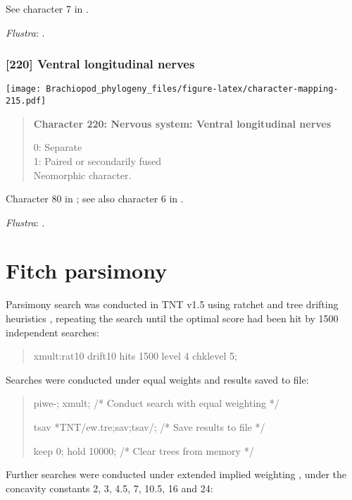 \documentclass[openany]{book}
\theoremstyle{definition}
\theoremstyle{definition}
\theoremstyle{definition}
\theoremstyle{remark}
\begin{document}
See character 7 in \citet{Haszprunar2008}.

\hypertarget{Flustra-coding-219}{}
\emph{Flustra}: \citet{Temereva2016Thenervous}.

\subsection*{{[}220{]} Ventral longitudinal
nerves}\label{ventral-longitudinal-nerves}

\texttt{[image: Brachiopod\_phylogeny\_files/figure-latex/character-mapping-215.pdf]}

\begin{quote}
\textbf{Character 220: Nervous system: Ventral longitudinal nerves}

0: Separate\\
1: Paired or secondarily fused\\
Neomorphic character.
\end{quote}

Character 80 in \citet{Glenner2004}; see also character 6 in
\citet{Vinther2008}.

\hypertarget{Flustra-coding-220}{}
\emph{Flustra}: \citet{Temereva2016Thenervous}.

\hypertarget{fitch}{\chapter{Fitch parsimony}\label{fitch}}

Parsimony search was conducted in TNT v1.5 \citep{Goloboff2016} using
ratchet and tree drifting heuristics \citep{Goloboff1999, Nixon1999},
repeating the search until the optimal score had been hit by 1500
independent searches:

\begin{quote}
xmult:rat10 drift10 hits 1500 level 4 chklevel 5;
\end{quote}

Searches were conducted under equal weights and results saved to file:

\begin{quote}
piwe-; xmult; {/* Conduct search with equal weighting */}

tsav *TNT/ew.tre;sav;tsav/; {/* Save results to file */}

keep 0; hold 10000; {/* Clear trees from memory */}
\end{quote}

Further searches were conducted under extended implied weighting
\citep{Goloboff1997, Goloboff2014}, under the concavity constants 2, 3,
4.5, 7, 10.5, 16 and 24:
\end{document}
